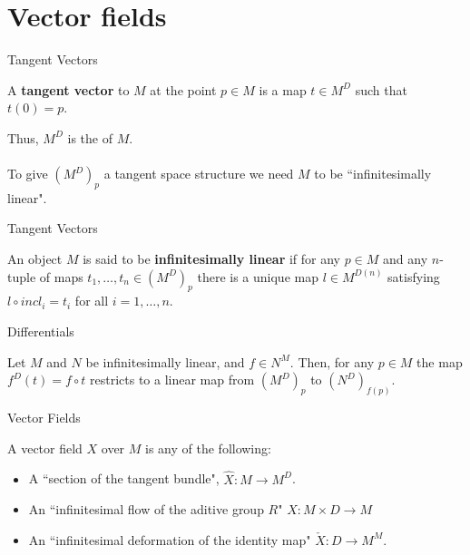 \documentclass[handout, 11pt]{beamer}
\begin{document}
\section{Vector fields}
\begin{frame}{Tangent Vectors}

	\begin{definition}
		A \textbf{tangent vector} to $M$ at the point $p\in M$ is a map 
		$t\in M^D$ such that $t(0)=p$.
	\end{definition}
	Thus, $M^D$ is the  of $M$. 
	\\~\\ To give $(M^D)_p$ a tangent space structure we need $M$ to be ``infinitesimally linear".
	 

\end{frame}

\begin{frame}{Tangent Vectors}
	\begin{definition} \label{def:inflinear}
		An object $M$ is said to be \textbf{infinitesimally linear} if for any $p\in M$ and 
		any	$n$-tuple of maps $t_1,\dots, t_n \in (M^D)_p$ there is a unique map $l\in M^{D(n)}$ satisfying 
		$l\circ incl_i=t_i$ for all $i=1,\dots,n$. 
	\end{definition} 
\end{frame}

\begin{frame}{Differentials}

	\begin{theorem} \label{prof:difflinear}
		Let $M$ and $N$ be infinitesimally linear, and $f\in N^M$. Then, for
		any $p\in M$ the map $f^D(t)=f\circ t$ restricts to a linear map from $(M^D)_p$
		to $(N^D)_{f(p)}$.
		
	\end{theorem}

\end{frame}
\begin{frame}{Vector Fields}
\begin{definition} 
	A vector field $X$ over $M$ is any of the following: 
	\begin{itemize}
		\item A ``section of the tangent bundle",  $\hat{X}:M\rightarrow M^D$.
		\item An ``infinitesimal flow
		of the aditive group $R$" $X: M\times D \rightarrow M$
		\item An ``infinitesimal
		deformation of the identity map" $\check{X}:D\rightarrow M^M$.
	\end{itemize}
\end{definition}
\end{frame}
\end{document}
